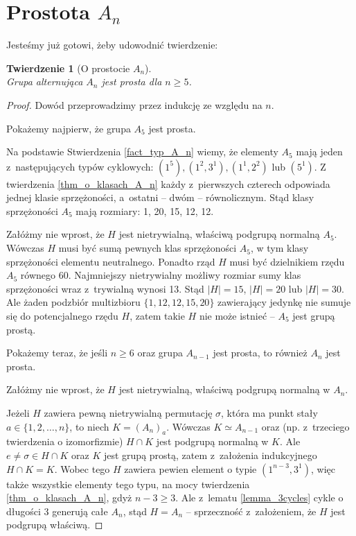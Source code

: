 \documentclass[licencjacka]{pracamgr}
\newtheorem{thh}{Twierdzenie}[section]
\begin{document}
\section{Prostota $A_n$}
Jesteśmy już gotowi, żeby udowodnić twierdzenie:

\begin{thh}[O prostocie $A_n$]\label{An_simplicity} $ $ \\
    Grupa alternująca $A_n$ jest prosta dla $n \ge 5$.
\end{thh}
\begin{proof}
    Dowód przeprowadzimy przez indukcję ze względu na $n$.

    Pokażemy najpierw, że grupa $A_5$ jest prosta.

    Na podstawie Stwierdzenia \ref{fact_typ_A_n} wiemy, że elementy $A_5$ mają jeden z~następujących typów cyklowych:
    $(1^5), (1^2, 3^1), (1^1, 2^2)$ lub $(5^1)$.
    Z twierdzenia \ref{thm_o_klasach_A_n} każdy z~pierwszych czterech odpowiada jednej klasie sprzężoności, a~ostatni -- dwóm -- równolicznym.
    Stąd klasy sprzężoności $A_5$ mają rozmiary: 1, 20, 15, 12, 12.

    Załóżmy nie wprost, że $H$ jest nietrywialną, właściwą podgrupą normalną $A_5$.
    Wówczas $H$ musi być sumą pewnych klas sprzężoności $A_5$, w tym klasy sprzężoności elementu neutralnego.
    Ponadto rząd $H$ musi być dzielnikiem rzędu $A_5$ równego 60.
    Najmniejszy nietrywialny możliwy rozmiar sumy klas sprzężoności wraz z~trywialną wynosi 13.
    Stąd $|H| = 15$, $|H| = 20$ lub $|H| = 30$.
    Ale żaden podzbiór multizbioru $\{1, 12, 12, 15, 20 \}$ zawierający jedynkę nie sumuje się do potencjalnego rzędu $H$,
    zatem takie $H$ nie może istnieć -- $A_5$ jest grupą prostą.

    Pokażemy teraz, że jeśli $n \ge 6$ oraz grupa $A_{n-1}$ jest prosta, to również $A_n$ jest prosta.

    Załóżmy nie wprost, że $H$ jest nietrywialną, właściwą podgrupą normalną w $A_n$.

    Jeżeli $H$ zawiera pewną nietrywialną permutację $\sigma$, która ma punkt stały $a \in \{ 1, 2, \ldots, n \}$, to niech $K = (A_{n})_a$.
    Wówczas $K \simeq A_{n-1}$ oraz (np. z~trzeciego twierdzenia o izomorfizmie) $H \cap K$ jest podgrupą normalną w $K$.
    Ale $e \ne \sigma \in H \cap K$ oraz $K$ jest grupą prostą, zatem z~założenia indukcyjnego $H \cap K = K$.
    Wobec tego $H$ zawiera pewien element o typie $(1^{n-3}, 3^1)$, więc także wszystkie elementy
    tego typu, na mocy twierdzenia \ref{thm_o_klasach_A_n}, gdyż $n-3 \ge 3$.
    Ale z~lematu \ref{lemma_3cycles}    cykle o długości 3 generują całe $A_n$, stąd $H = A_n$ --
    sprzeczność z~założeniem, że $H$ jest podgrupą właściwą.


\end{proof}
\end{document}
